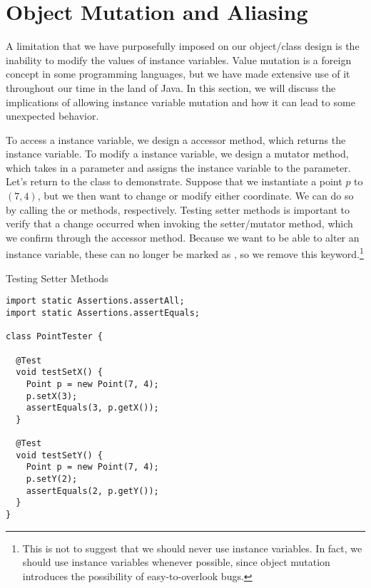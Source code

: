 \section{Object Mutation and Aliasing}
\label{sec:object-mutation-and-aliasing}
A limitation that we have purposefully imposed on our object/class design is the inability to modify the values of instance variables. Value mutation is a foreign concept in some programming languages, but we have made extensive use of it throughout our time in the land of Java. In this section, we will discuss the implications of allowing instance variable mutation and how it can lead to some unexpected behavior.

To access a  instance variable, we design a  accessor method, which returns the instance variable. To modify a  instance variable, we design a  mutator method, which takes in a parameter and assigns the instance variable to the parameter. Let's return to the  class to demonstrate. Suppose that we instantiate a point $p$ to $(7, 4)$, but we then want to change or modify either coordinate. We can do so by calling the  or  methods, respectively. Testing setter methods is important to verify that a change occurred when invoking the setter/mutator method, which we confirm through the accessor method. Because we want to be able to alter an instance variable, these can no longer be marked as , so we remove this keyword.\footnote{This is not to suggest that we should never use  instance variables. In fact, we should use  instance variables whenever possible, since object mutation introduces the possibility of easy-to-overlook bugs.}

\begin{cl}{Testing  Setter Methods}
\begin{lstlisting}[language=MyJava]
import static Assertions.assertAll;
import static Assertions.assertEquals;

class PointTester {

  @Test
  void testSetX() {
    Point p = new Point(7, 4);
    p.setX(3);
    assertEquals(3, p.getX());
  }

  @Test
  void testSetY() {
    Point p = new Point(7, 4);
    p.setY(2);
    assertEquals(2, p.getY());
  }
}
\end{lstlisting}
\end{cl}

